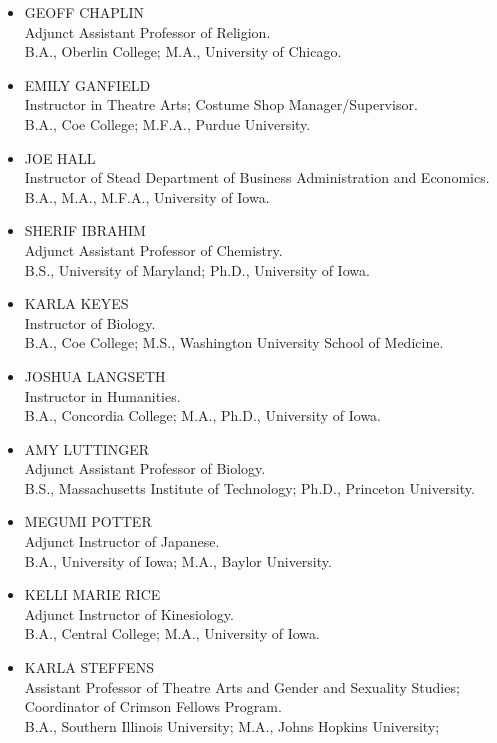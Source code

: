 \documentclass[
  letterpaper,
]{scrbook}
\begin{document}
\begin{itemize}
\item
  GEOFF CHAPLIN\\
  Adjunct Assistant Professor of Religion.\\
  B.A., Oberlin College; M.A., University of Chicago.
\item
  EMILY GANFIELD\\
  Instructor in Theatre Arts; Costume Shop Manager/Supervisor.\\
  B.A., Coe College; M.F.A., Purdue University.
\item
  JOE HALL\\
  Instructor of Stead Department of Business Administration and
  Economics.\\
  B.A., M.A., M.F.A., University of Iowa.
\item
  SHERIF IBRAHIM\\
  Adjunct Assistant Professor of Chemistry.\\
  B.S., University of Maryland; Ph.D., University of Iowa.
\item
  KARLA KEYES\\
  Instructor of Biology.\\
  B.A., Coe College; M.S., Washington University School of Medicine.
\item
  JOSHUA LANGSETH\\
  Instructor in Humanities.\\
  B.A., Concordia College; M.A., Ph.D., University of Iowa.
\item
  AMY LUTTINGER\\
  Adjunct Assistant Professor of Biology.\\
  B.S., Massachusetts Institute of Technology; Ph.D., Princeton
  University.
\item
  MEGUMI POTTER\\
  Adjunct Instructor of Japanese.\\
  B.A., University of Iowa; M.A., Baylor University.
\item
  KELLI MARIE RICE\\
  Adjunct Instructor of Kinesiology.\\
  B.A., Central College; M.A., University of Iowa.
\item
  KARLA STEFFENS\\
  Assistant Professor of Theatre Arts and Gender and Sexuality Studies;
  Coordinator of Crimson Fellows Program.\\
  B.A., Southern Illinois University; M.A., Johns Hopkins University;

\end{itemize}
\end{document}

